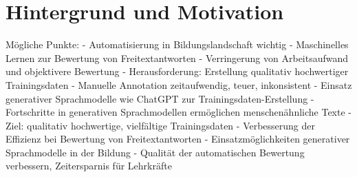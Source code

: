 \section{Hintergrund und Motivation}
\label{sec:Background}

Mögliche Punkte:
- Automatisierung in Bildungslandschaft wichtig
- Maschinelles Lernen zur Bewertung von Freitextantworten
- Verringerung von Arbeitsaufwand und objektivere Bewertung
- Herausforderung: Erstellung qualitativ hochwertiger Trainingsdaten
- Manuelle Annotation zeitaufwendig, teuer, inkonsistent
- Einsatz generativer Sprachmodelle wie ChatGPT zur Trainingsdaten-Erstellung
- Fortschritte in generativen Sprachmodellen ermöglichen menschenähnliche Texte
- Ziel: qualitativ hochwertige, vielfältige Trainingsdaten
- Verbesserung der Effizienz bei Bewertung von Freitextantworten
- Einsatzmöglichkeiten generativer Sprachmodelle in der Bildung
- Qualität der automatischen Bewertung verbessern, Zeitersparnis für Lehrkräfte